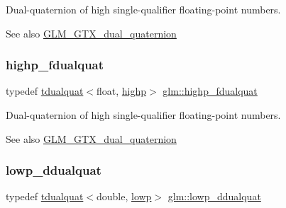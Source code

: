 Dual-\/quaternion of high single-\/qualifier floating-\/point numbers.

\begin{DoxySeeAlso}{See also}
\hyperlink{group__gtx__dual__quaternion}{G\+L\+M\+\_\+\+G\+T\+X\+\_\+dual\+\_\+quaternion} 
\end{DoxySeeAlso}
\mbox{\label{group__gtx__dual__quaternion_ga8c46d61c38b2b6d9c5091c667dd20fe8}} 
\subsubsection{\texorpdfstring{highp\+\_\+fdualquat}{highp\_fdualquat}}
{\footnotesize\ttfamily typedef \hyperlink{structglm_1_1tdualquat}{tdualquat}$<$float, \hyperlink{namespaceglm_a36ed105b07c7746804d7fdc7cc90ff25ac6f7eab42eacbb10d59a58e95e362074}{highp}$>$ \hyperlink{group__gtx__dual__quaternion_ga8c46d61c38b2b6d9c5091c667dd20fe8}{glm\+::highp\+\_\+fdualquat}}

Dual-\/quaternion of high single-\/qualifier floating-\/point numbers.

\begin{DoxySeeAlso}{See also}
\hyperlink{group__gtx__dual__quaternion}{G\+L\+M\+\_\+\+G\+T\+X\+\_\+dual\+\_\+quaternion} 
\end{DoxySeeAlso}
\mbox{\label{group__gtx__dual__quaternion_ga361a2ea6cce1446a8ab7e7803156c16c}} 
\subsubsection{\texorpdfstring{lowp\+\_\+ddualquat}{lowp\_ddualquat}}
{\footnotesize\ttfamily typedef \hyperlink{structglm_1_1tdualquat}{tdualquat}$<$double, \hyperlink{namespaceglm_a36ed105b07c7746804d7fdc7cc90ff25ae161af3fc695e696ce3bf69f7332bc2d}{lowp}$>$ \hyperlink{group__gtx__dual__quaternion_ga361a2ea6cce1446a8ab7e7803156c16c}{glm\+::lowp\+\_\+ddualquat}}

